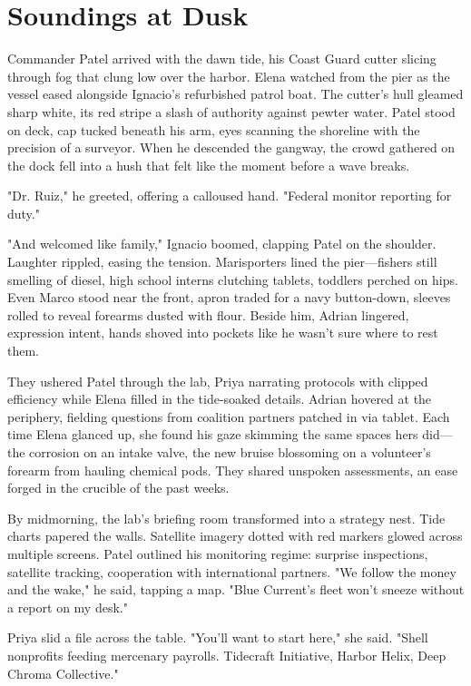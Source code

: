 \chapter{Soundings at Dusk}

Commander Patel arrived with the dawn tide, his Coast Guard cutter slicing through fog that clung low over the harbor. Elena watched from the pier as the vessel eased alongside Ignacio's refurbished patrol boat. The cutter's hull gleamed sharp white, its red stripe a slash of authority against pewter water. Patel stood on deck, cap tucked beneath his arm, eyes scanning the shoreline with the precision of a surveyor. When he descended the gangway, the crowd gathered on the dock fell into a hush that felt like the moment before a wave breaks.

"Dr. Ruiz," he greeted, offering a calloused hand. "Federal monitor reporting for duty."

"And welcomed like family," Ignacio boomed, clapping Patel on the shoulder. Laughter rippled, easing the tension. Marisporters lined the pier—fishers still smelling of diesel, high school interns clutching tablets, toddlers perched on hips. Even Marco stood near the front, apron traded for a navy button-down, sleeves rolled to reveal forearms dusted with flour. Beside him, Adrian lingered, expression intent, hands shoved into pockets like he wasn't sure where to rest them.

They ushered Patel through the lab, Priya narrating protocols with clipped efficiency while Elena filled in the tide-soaked details. Adrian hovered at the periphery, fielding questions from coalition partners patched in via tablet. Each time Elena glanced up, she found his gaze skimming the same spaces hers did—the corrosion on an intake valve, the new bruise blossoming on a volunteer's forearm from hauling chemical pods. They shared unspoken assessments, an ease forged in the crucible of the past weeks.

By midmorning, the lab's briefing room transformed into a strategy nest. Tide charts papered the walls. Satellite imagery dotted with red markers glowed across multiple screens. Patel outlined his monitoring regime: surprise inspections, satellite tracking, cooperation with international partners. "We follow the money and the wake," he said, tapping a map. "Blue Current's fleet won't sneeze without a report on my desk."

Priya slid a file across the table. "You'll want to start here," she said. "Shell nonprofits feeding mercenary payrolls. Tidecraft Initiative, Harbor Helix, Deep Chroma Collective."

